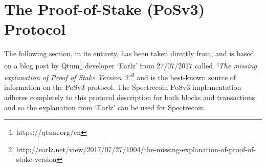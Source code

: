 \section{The Proof-of-Stake (PoSv3) Protocol }
The following section, in its entirety, has been taken directly from, and is based on a blog post by Qtum\footnote{https://qtum.org/en} 
developer ‘Earlz’ from 27/07/2017 called \textit{“The missing explanation of Proof of Stake Version 3”}\footnote{http://earlz.net/view/2017/07/27/1904/the-missing-explanation-of-proof-of-stake-version } and is the 
best-known source of information on the PoSv3 protocol. The Spectrecoin PoSv3 implementation adheres 
completely to this protocol description for both blocks and transactions and so the explanation from ‘Earlz’ 
can be used for Spectrecoin. 